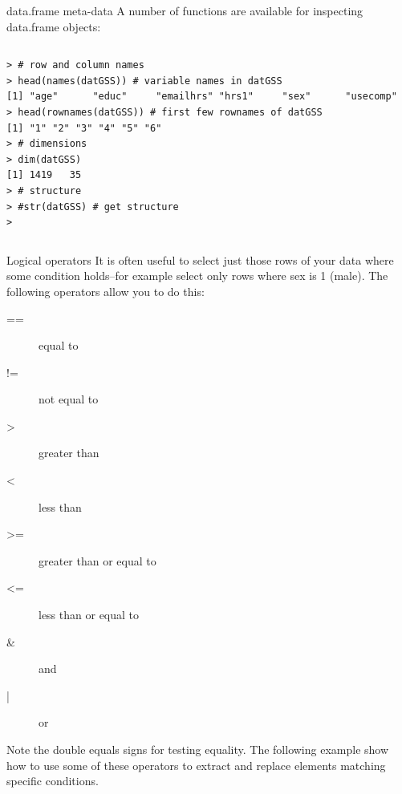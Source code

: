 \documentclass[table,smaller]{beamer}
\begin{document}
\begin{frame}[fragile,label=sec-6-2]{data.frame meta-data}
 A number of functions are available for inspecting data.frame objects:

\vspace{-.5em}
\begin{columns}
\begin{block}{}
\begin{verbatim}
> # row and column names
> head(names(datGSS)) # variable names in datGSS
[1] "age"      "educ"     "emailhrs" "hrs1"     "sex"      "usecomp" 
> head(rownames(datGSS)) # first few rownames of datGSS
[1] "1" "2" "3" "4" "5" "6"
> # dimensions
> dim(datGSS)
[1] 1419   35
> # structure
> #str(datGSS) # get structure
>
\end{verbatim}
\end{block}
\end{columns}
\vspace{.5em}
\end{frame}


\begin{frame}[label=sec-6-3]{Logical operators}
It is often useful to select just those rows of your data where some condition holds--for example select only rows where sex is 1 (male). The following operators allow you to do this:

\begin{description}
\item[{==}] equal to
\item[{!=}] not equal to
\item[{>}] greater than
\item[{<}] less than
\item[{>=}] greater than or equal to
\item[{<=}] less than or equal to
\item[{\&}] and
\item[{|}] or
\end{description}

Note the double equals signs for testing equality. The following example show how to use some of these operators to extract and replace elements matching specific conditions.
\end{frame}
\end{document}
